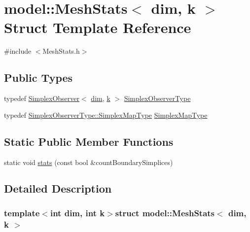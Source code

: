 \hypertarget{structmodel_1_1_mesh_stats}{}\section{model\+:\+:Mesh\+Stats$<$ dim, k $>$ Struct Template Reference}
\label{structmodel_1_1_mesh_stats}


{\ttfamily \#include $<$Mesh\+Stats.\+h$>$}

\subsection*{Public Types}
\begin{DoxyCompactItemize}
\item 
typedef \hyperlink{structmodel_1_1_simplex_observer}{Simplex\+Observer}$<$ \hyperlink{plot_nd_a_8m_a382f3ca768b275b8d563604f7fc7df73}{dim}, \hyperlink{_f_e_m_2linear__elasticity__3d_2tetgen_2generate_p_o_l_ycube_8m_a5d2aad4440da75aa43f2643e72b1a3bd}{k} $>$ \hyperlink{structmodel_1_1_mesh_stats_a350323ddc14149a0c597700575af6cf4}{Simplex\+Observer\+Type}
\item 
typedef \hyperlink{structmodel_1_1_simplex_observer_a220336a365d54235796aef669aebbf45}{Simplex\+Observer\+Type\+::\+Simplex\+Map\+Type} \hyperlink{structmodel_1_1_mesh_stats_a4c7a03688dd8024867a3253fc5a276b9}{Simplex\+Map\+Type}
\end{DoxyCompactItemize}
\subsection*{Static Public Member Functions}
\begin{DoxyCompactItemize}
\item 
static void \hyperlink{structmodel_1_1_mesh_stats_adc1be6514823958b0397f8430472ea85}{stats} (const bool \&count\+Boundary\+Simplices)
\end{DoxyCompactItemize}


\subsection{Detailed Description}
\subsubsection*{template$<$int dim, int k$>$struct model\+::\+Mesh\+Stats$<$ dim, k $>$}



